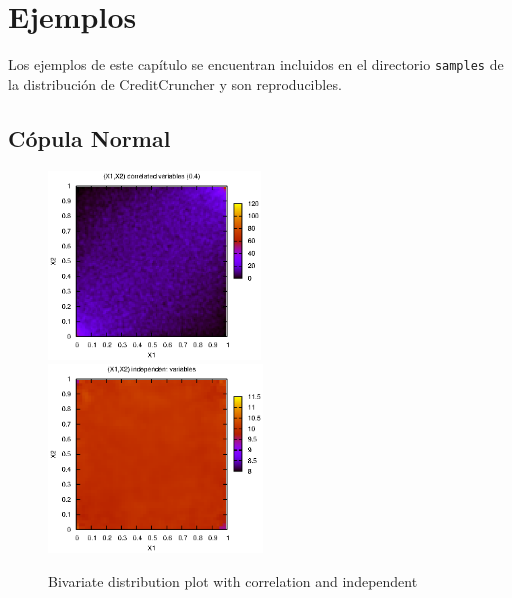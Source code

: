 
%
%
%
%
%
%
%
%

\chapter{Ejemplos}
\label{sec:examples}

Los ejemplos de este cap\'itulo se encuentran incluidos en el directorio
\verb+samples+ de la distribuci\'on de CreditCruncher y son reproducibles.

\section{C\'opula Normal}

\begin{figure}[!hb]
\begin{center}
\includegraphics[height=5cm, angle=0]{./images/copula.eps}
\includegraphics[height=5cm, angle=0]{./images/uniform.eps}
\caption{Bivariate distribution plot with correlation and independent}
\label{copulas}
\end{center}
\end{figure}


